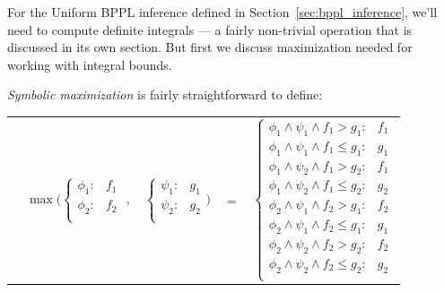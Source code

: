 \documentclass{article} %
\begin{document}
For the Uniform BPPL inference defined in
Section~\ref{sec:bppl_inference}, we'll need to compute definite
integrals --- a fairly non-trivial operation that is discussed in its
own section.  But first we discuss maximization needed for working
with integral bounds.

\emph{Symbolic maximization} is fairly straightforward
to define:

{\footnotesize
\begin{center}
\begin{tabular}{r c c c l}
&
\hspace{-9mm} $\max \Bigg(
  \begin{cases}
    \phi_1: & f_1 \\ 
    \phi_2: & f_2 \\ 
  \end{cases}$
$,$
&
\hspace{-4mm}
  $\begin{cases}
    \psi_1: & g_1 \\ 
    \psi_2: & g_2 \\ 
  \end{cases} \Bigg)$
&
\hspace{-4mm} 
$ = $
&
\hspace{-4mm}
  $\begin{cases}
  \phi_1 \wedge \psi_1 \wedge f_1 > g_1    : & f_1 \\ 
  \phi_1 \wedge \psi_1 \wedge f_1 \leq g_1 : & g_1 \\ 
  \phi_1 \wedge \psi_2 \wedge f_1 > g_2    : & f_1 \\ 
  \phi_1 \wedge \psi_2 \wedge f_1 \leq g_2 : & g_2 \\ 
  \phi_2 \wedge \psi_1 \wedge f_2 > g_1    : & f_2 \\ 
  \phi_2 \wedge \psi_1 \wedge f_2 \leq g_1 : & g_1 \\ 
  \phi_2 \wedge \psi_2 \wedge f_2 > g_2    : & f_2 \\ 
  \phi_2 \wedge \psi_2 \wedge f_2 \leq g_2 : & g_2 \\ 
  \end{cases}$
\end{tabular}
\end{center}
}
\end{document}
